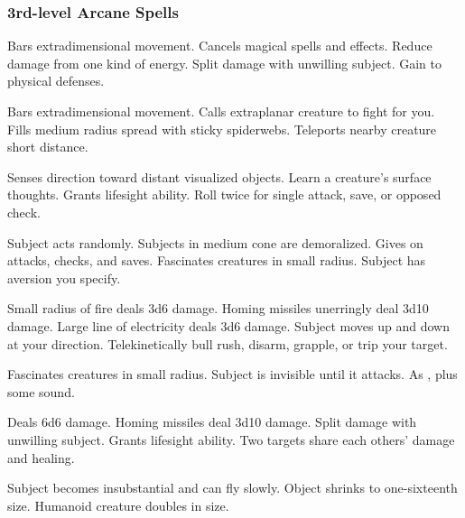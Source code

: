 \subsubsection{3rd-level Arcane Spells} 
\begin{swspelllist}
   Bars extradimensional movement.
   Cancels magical spells and effects.
   Reduce damage from one kind of energy.
   Split damage with unwilling subject.
   Gain  to physical defenses.

   Bars extradimensional movement.
   Calls extraplanar creature to fight for you.
   Fills medium radius spread with sticky spiderwebs.
   Teleports nearby creature short distance.

   Senses direction toward distant visualized objects.
   Learn a creature's surface thoughts.
   Grants lifesight ability.
   Roll twice for single attack, save, or opposed check.

   Subject acts randomly.
   Subjects in medium cone are demoralized.
   Gives  on attacks, checks, and saves.
   Fascinates creatures in small radius.
   Subject has aversion you specify.

   Small radius of fire deals 3d6 damage.
   Homing missiles unerringly deal 3d10 damage.
   Large line of electricity deals 3d6 damage.
   Subject moves up and down at your direction.
   Telekinetically bull rush, disarm, grapple, or trip your target.

   Fascinates creatures in small radius.
   Subject is invisible until it attacks.
   As , plus some sound.

   Deals 6d6 damage.
   Homing missiles deal 3d10 damage.
   Split damage with unwilling subject.
   Grants lifesight ability.
   Two targets share each others' damage and healing.

   Subject becomes insubstantial and can fly slowly.
   Object shrinks to one-sixteenth size.
   Humanoid creature doubles in size.
\end{swspelllist}

